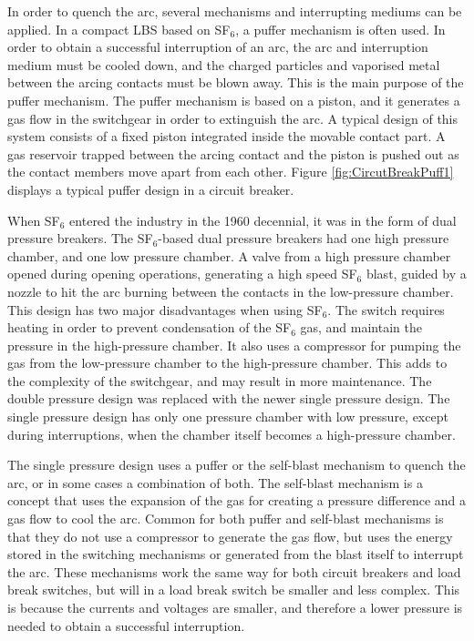 \documentclass[10pt,b5paper,twoside]{article}
\begin{document}
In order to quench the arc, several mechanisms and interrupting mediums can be applied. In a compact LBS based on SF$_6$, a puffer mechanism is often used. In order to obtain a successful interruption of an arc, the arc and interruption medium must be cooled down, and the charged particles and vaporised metal between the arcing contacts must be blown away. This is the main purpose of the puffer mechanism. The puffer mechanism is based on a piston, and it generates a gas flow in the switchgear in order to extinguish the arc. A typical design of this system consists of a fixed piston integrated inside the movable contact part. A gas reservoir trapped between the arcing contact and the piston is pushed out as the contact members move apart from each other. Figure \ref{fig:CircutBreakPuff1} displays a typical puffer design in a circuit breaker.

When SF$_6$ entered the industry in the 1960 decennial, it was in the form of dual pressure breakers. The SF$_6$-based dual pressure breakers had one high pressure chamber, and one low pressure chamber. A valve from a high pressure chamber opened during opening operations, generating a high speed SF$_6$ blast, guided by a nozzle to hit the arc burning between the contacts in the low-pressure chamber. This design has two major disadvantages when using SF$_6$. The switch requires heating in order to prevent condensation of the SF$_6$ gas, and maintain the pressure in the high-pressure chamber. It also uses a compressor for pumping the gas from the low-pressure chamber to the high-pressure chamber. This adds to the complexity of the switchgear, and may result in more maintenance. The double pressure design was replaced with the newer single pressure design. The single pressure design has only one pressure chamber with low pressure, except during interruptions, when the chamber itself becomes a high-pressure chamber.

The single pressure design uses a puffer or the self-blast mechanism to quench the arc, or in some cases a combination of both. The self-blast mechanism is a concept that uses the expansion of the gas for creating a pressure difference and a gas flow to cool the arc. Common for both puffer and self-blast mechanisms is that they do not use a compressor to generate the gas flow, but uses the energy stored in the switching mechanisms or generated from the blast itself to interrupt the arc. These mechanisms work the same way for both circuit breakers and load break switches, but will in a load break switch be smaller and less complex. This is because the currents and voltages are smaller, and therefore a lower pressure is needed to obtain a successful interruption.
\end{document}
